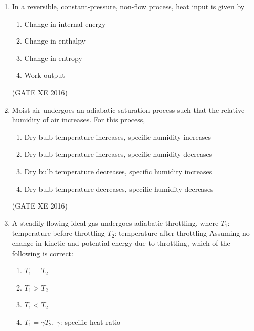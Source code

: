 \documentclass[12pt]{article}
\begin{document}
\begin{enumerate}
\begin{multicols}{4}
\begin{enumerate}
\item 600 K
\item 1200 K
\item 900 K
\item 450 K
\end{enumerate}
\end{multicols}

(GATE XE 2016)

\item In a reversible, constant-pressure, non-flow process, heat input is given by

\begin{enumerate}
\item Change in internal energy
\item Change in enthalpy
\item Change in entropy
\item Work output
\end{enumerate}

(GATE XE 2016)

\item Moist air undergoes an adiabatic saturation process such that the relative humidity of air increases. For this process,

\begin{enumerate}
\item Dry bulb temperature increases, specific humidity increases
\item Dry bulb temperature increases, specific humidity decreases
\item Dry bulb temperature decreases, specific humidity increases
\item Dry bulb temperature decreases, specific humidity decreases
\end{enumerate}

(GATE XE 2016)

\item A steadily flowing ideal gas undergoes adiabatic throttling, where  
$T_1$: temperature before throttling  
$T_2$: temperature after throttling  
Assuming no change in kinetic and potential energy due to throttling, which of the following is correct:

\begin{multicols}{2}
\begin{enumerate}
\item $T_1 = T_2$
\item $T_1 > T_2$
\item $T_1 < T_2$
\item $T_1 = \gamma T_2, \ \gamma$: specific heat ratio
\end{enumerate}
\end{multicols}


\end{enumerate}
\end{document}
